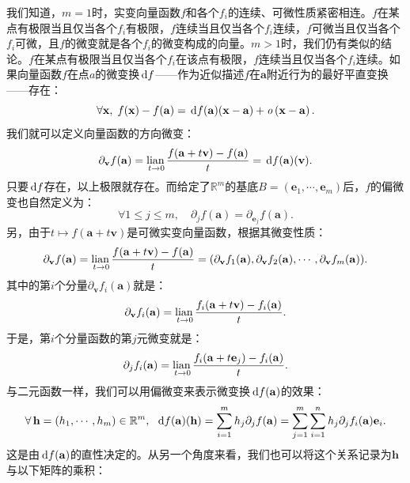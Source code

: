 \documentclass[12pt,UTF8,fontset=none]{ctexbook}
\begin{document}
我们知道，$m=1$时，实变向量函数$f$和各个$f_i$的连续、可微性质紧密相连。$f$在某点有极限当且仅当各个$f_i$有极限，$f$连续当且仅当各个$f_i$连续，$f$可微当且仅当各个$f_i$可微，且$f$的微变就是各个$f_i$的微变构成的向量。$m>1$时，我们仍有类似的结论。$f$在某点有极限当且仅当各个$f_i$在该点有极限，$f$连续当且仅当各个$f_i$连续。如果向量函数$f$在点$a$的微变换$\,\mathrm{d} f$——作为近似描述$f$在$\mathbf{a}$附近行为的最好平直变换——存在：
$$ \forall \mathbf{x}, \; f(\mathbf{x}) - f(\mathbf{a}) = \,\mathrm{d} f (\mathbf{a})(\mathbf{x} - \mathbf{a}) + \mathit{o}\left(\mathbf{x} - \mathbf{a}\right). $$
我们就可以定义向量函数的方向微变：
$$ \partial_{\mathbf{v}} f(\mathbf{a}) = \underset{t\to 0}{\operatorname{lian}\,} \frac{f(\mathbf{a} + t\mathbf{v}) - f(\mathbf{a})}{t} = \,\mathrm{d} f (\mathbf{a})(\mathbf{v}).$$
只要$\,\mathrm{d} f$存在，以上极限就存在。而给定了$\mathbb{R}^m$的基底$B=(\mathbf{e}_1,\cdots,\mathbf{e}_m)$后，$f$的偏微变也自然定义为：
$$ \forall 1\leqslant j\leqslant m, \quad\partial_j f(\mathbf{a}) = \partial_{\mathbf{e}_j} f(\mathbf{a}). $$
另，由于$t\mapsto f(\mathbf{a} + t\mathbf{v})$是可微实变向量函数，根据其微变性质：
$$ \partial_{\mathbf{v}} f(\mathbf{a}) = \underset{t\to 0}{\operatorname{lian}\,} \frac{f(\mathbf{a} + t\mathbf{v}) - f(\mathbf{a})}{t} = (\partial_{\mathbf{v}} f_1(\mathbf{a}), \partial_{\mathbf{v}} f_2(\mathbf{a}), \cdots, \partial_{\mathbf{v}} f_m(\mathbf{a})).$$
其中的第$i$个分量$\partial_{\mathbf{v}} f_i(\mathbf{a})$就是：
$$ \partial_{\mathbf{v}} f_i(\mathbf{a}) = \underset{t\to 0}{\operatorname{lian}\,} \frac{f_i(\mathbf{a} + t\mathbf{v}) - f_i(\mathbf{a})}{t}. $$
于是，第$i$个分量函数的第$j$元微变就是：
$$ \partial_{j} f_i(\mathbf{a}) = \underset{t\to 0}{\operatorname{lian}\,} \frac{f_i(\mathbf{a} + t\mathbf{e}_j) - f_i(\mathbf{a})}{t}. $$
与二元函数一样，我们可以用偏微变来表示微变换$\,\mathrm{d} f (\mathbf{a})$的效果：
$$ \forall\, \mathbf{h} = (h_1,\cdots, h_m) \in\mathbb{R}^m,\,\,\, \,\mathrm{d} f (\mathbf{a})(\mathbf{h}) = \sum_{i=1}^m h_j\partial_{j} f(\mathbf{a}) = \sum_{j=1}^m \sum_{i=1}^n h_j\partial_{j} f_i(\mathbf{a})\mathbf{e}_i.  $$
这是由$\,\mathrm{d} f (\mathbf{a})$的直性决定的。从另一个角度来看，我们也可以将这个关系记录为$\mathbf{h}$与以下矩阵的乘积：
\end{document}
